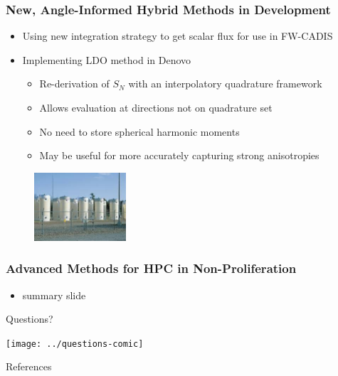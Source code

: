 \documentclass[xcolor=x11names,compress]{beamer}
\renewcommand{\(}{\begin{columns}}
\renewcommand{\)}{\end{columns}}
\newcommand{\<}[1]{\begin{column}{#1}}
\renewcommand{\>}{\end{column}}
\begin{document}
\begin{frame}[fragile]
  \frametitle{New, Angle-Informed Hybrid Methods in Development}

	\begin{itemize}
	\item Using new integration strategy to get scalar flux for use in 
	      FW-CADIS \cite{Peplow2012}
	\item Implementing LDO method \cite{Ahrens2014} in Denovo
	  \begin{itemize}
	  \item Re-derivation of $S_N$ with an interpolatory quadrature framework
	  \item Allows evaluation at directions not on quadrature set
	  \item No need to store spherical harmonic moments
	  \item May be useful for more accurately capturing strong anisotropies
	  \end{itemize}
	\end{itemize}
	
	\begin{center}
 	\begin{figure}
 	\includegraphics[height=1in,clip]{../figs/isfsi}
    \end{figure}
 	\end{center}

\end{frame}

\begin{frame}[fragile]
  \frametitle{Advanced Methods for HPC in Non-Proliferation}

	\begin{itemize}
	\item summary slide
	\end{itemize}

\end{frame}

\begin{frame}[fragile]{Questions?}

    \begin{center}
    \texttt{[image: ../questions-comic]}  
    \end{center}
  
\end{frame}

\begin{frame}[allowframebreaks]{References}
	
	
\end{frame}
\end{document}
